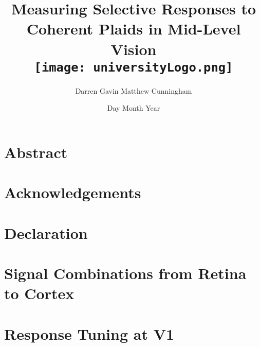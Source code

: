 \documentclass[11pt, a4paper]{report}
\title{
	{Measuring Selective Responses to Coherent Plaids in Mid-Level Vision}\\
	\bigskip
	{\texttt{[image: universityLogo.png]}}
}
\author{Darren Gavin Matthew Cunningham}
\date{Day Month Year}
\numberwithin{equation}{section}
\begin{document}
\maketitle


\chapter*{Abstract}


\chapter*{}


\chapter*{Acknowledgements}


\chapter*{Declaration}


\chapter*{}


\tableofcontents

\listoffigures

\listoftables




\chapter{Signal Combinations from Retina to Cortex}



\chapter{Response Tuning at V1}
%
\end{document}
